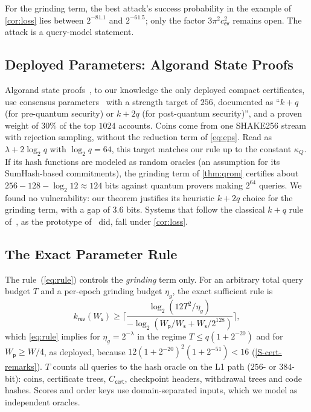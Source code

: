 \documentclass[10pt,journal,compsoc]{IEEEtran}
\theoremstyle{tplain}
\theoremstyle{tdef}
\theoremstyle{remark}
\newcommand{\Ws}{W_{\mathsf{s}}}
\newcommand{\Wp}{W_{\mathsf{p}}}
\newcommand{\kr}{k_{\mathsf{rev}}}
\newcommand{\cert}{\mathsf{cert}}
\begin{document}
\noindent For the grinding term, the best attack's success probability in the example of \cref{cor:loss} lies between $2^{-81.1}$ and $2^{-61.5}$; only the factor $3\pi^2c_{\mathsf{ev}}^2$ remains open. The attack is a query-model statement.

\subsection{Deployed Parameters: Algorand State Proofs}\label{S-cert-algorand}
Algorand state proofs~\cite{algorand_stateproofs}, to our knowledge the only deployed compact certificates, use consensus parameters~\cite{goalgorand_consensus} with a strength target of $256$, documented as ``$k+q$ (for pre-quantum security) or $k+2q$ (for post-quantum security)'', and a proven weight of $30\%$ of the top $1024$ accounts. Coins come from one SHAKE256 stream with rejection sampling, without the reduction term of \cref{eq:eps}. Read as $\lambda+2\log_2 q$ with $\log_2 q=64$, this target matches our rule up to the constant $\kappa_Q$. If its hash functions are modeled as random oracles (an assumption for its SumHash-based commitments), the grinding term of \cref{thm:qrom} certifies about $256-128-\log_2 12\approx 124$ bits against quantum provers making $2^{64}$ queries. We found no vulnerability: our theorem justifies its heuristic $k+2q$ choice for the grinding term, with a gap of $3.6$ bits. Systems that follow the classical $k+q$ rule of~\cite{micali2020compact}, as the prototype of~\cite{NIROPoK2025} did, fall under \cref{cor:loss}.

\subsection{The Exact Parameter Rule}\label{S-cert-rule}
The rule~(\ref{eq:rule}) controls the \emph{grinding} term only. For an arbitrary total query budget $T$ and a per-epoch grinding budget $\eta_g$, the exact sufficient rule is
\[
\kr(\Ws)\ge\Big\lceil\frac{\log_2(12T^2/\eta_g)}{-\log_2(\Wp/\Ws+\Ws/2^{128})}\Big\rceil ,
\]
which \cref{eq:rule} implies for $\eta_g=2^{-\lambda}$ in the regime $T\le q(1+2^{-20})$ and for $\Wp\ge W/4$, as deployed, because $12(1+2^{-20})^2(1+2^{-51})<16$ (\cref{S-cert-remarks}). $T$ counts all queries to the hash oracle on the L1 path ($256$- or $384$-bit): coins, certificate trees, $C_{\cert}$, checkpoint headers, withdrawal trees and code hashes. Scores and order keys use domain-separated inputs, which we model as independent oracles.
\end{document}
